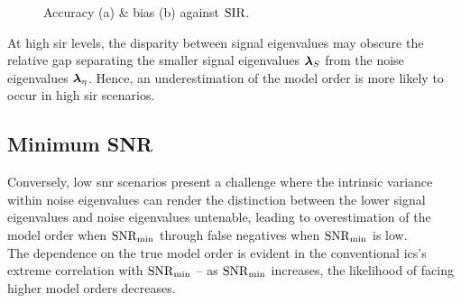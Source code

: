 \begin{figure}[H]
    \centering
    \caption{Accuracy (a) \& bias (b) against \( \mathrm{SIR} \).}%
    \label{fig:sir_all_acc_bias}
\end{figure}

At high \gls{sir} levels, the disparity between signal eigenvalues may obscure the relative gap separating the smaller
signal eigenvalues \( \boldsymbol{\lambda}_S \) from the noise eigenvalues \( \boldsymbol{\lambda}_{\eta} \).
Hence, an underestimation of the
model order is more likely to occur in high \gls{sir} scenarios.

\subsection{Minimum SNR}
\label{subsec:min_snr}
Conversely, low \gls{snr} scenarios present a challenge where the
intrinsic variance within noise eigenvalues can render the distinction between the lower signal eigenvalues and noise eigenvalues untenable,
leading to overestimation of the model order when \( \mathrm{SNR}_{\min} \) through false negatives when \( \mathrm{SNR}_{\min} \) is low. \\
The dependence on the true model order is evident in the conventional \glspl{ic}'s extreme correlation with \( \mathrm{SNR}_{\min} \) --
as \( \mathrm{SNR}_{\min} \) increases, the likelihood of facing higher model orders decreases. \\


